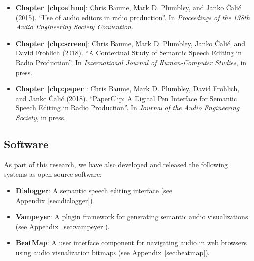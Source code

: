 
\nocite{Baume2015,Baume2018a,Baume2018}
\begin{itemize}
  \item \textbf{Chapter~\ref{chp:ethno}}: Chris Baume, Mark D. Plumbley, and Janko \'{C}ali\'{c} (2015). ``Use of audio
    editors in radio production''. In \textit{Proceedings of the 138th Audio Engineering Society Convention}.
  \item \textbf{Chapter~\ref{chp:screen}}: Chris Baume, Mark D. Plumbley, Janko \'{C}ali\'{c}, and David Frohlich
    (2018). ``A Contextual Study of Semantic Speech Editing in Radio Production''. In \textit{International Journal of
    Human-Computer Studies}, in press.
  \item \textbf{Chapter~\ref{chp:paper}}: Chris Baume, Mark D. Plumbley, David Frohlich, and Janko \'{C}ali\'{c}
    (2018).  ``PaperClip: A Digital Pen Interface for Semantic Speech Editing in Radio Production''. In \textit{Journal
    of the Audio Engineering Society}, in press.   
\end{itemize}

\subsection*{Software}
As part of this research, we have also developed and released the following systems as open-source software:

\begin{itemize}
  \item \textbf{Dialogger}: A semantic speech editing interface (see Appendix~\ref{sec:dialogger}).
  \item \textbf{Vampeyer}: A plugin framework for generating semantic audio visualizations (see
    Appendix~\ref{sec:vampeyer}).
  \item \textbf{BeatMap}: A user interface component for navigating audio in web browsers using audio visualization
    bitmaps (see Appendix~\ref{sec:beatmap}).
\end{itemize}

